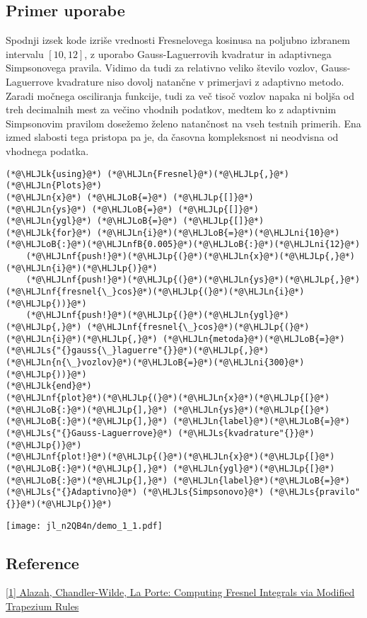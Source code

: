 \documentclass[12pt,a4paper]{article}
\newcommand{\HLJLk}[1]{\textcolor[RGB]{148,91,176}{\textbf{#1}}}
\newcommand{\HLJLn}[1]{#1}
\newcommand{\HLJLnf}[1]{\textcolor[RGB]{66,102,213}{#1}}
\newcommand{\HLJLs}[1]{\textcolor[RGB]{201,61,57}{#1}}
\newcommand{\HLJLnfB}[1]{\textcolor[RGB]{59,151,46}{#1}}
\newcommand{\HLJLni}[1]{\textcolor[RGB]{59,151,46}{#1}}
\newcommand{\HLJLoB}[1]{\textcolor[RGB]{102,102,102}{\textbf{#1}}}
\newcommand{\HLJLp}[1]{#1}
\begin{document}
\subsection{Primer uporabe}

Spodnji izsek kode izriše vrednosti Fresnelovega kosinusa na poljubno izbranem intervalu $[10,12]$, z uporabo Gauss-Laguerrovih kvadratur in adaptivnega Simpsonovega pravila. Vidimo da tudi za relativno veliko število vozlov, Gauss-Laguerrove kvadrature niso dovolj natančne v primerjavi z adaptivno metodo. Zaradi močnega osciliranja funkcije, tudi za več tisoč vozlov  napaka ni boljša od treh decimalnih mest za večino vhodnih podatkov, medtem ko z adaptivnim  Simpsonovim pravilom dosežemo želeno natančnost na vseh testnih primerih. Ena izmed slabosti tega pristopa pa je, da časovna kompleksnost ni neodvisna od vhodnega podatka. 


\begin{lstlisting}
(*@\HLJLk{using}@*) (*@\HLJLn{Fresnel}@*)(*@\HLJLp{,}@*) (*@\HLJLn{Plots}@*)
(*@\HLJLn{x}@*) (*@\HLJLoB{=}@*) (*@\HLJLp{[]}@*)
(*@\HLJLn{ys}@*) (*@\HLJLoB{=}@*) (*@\HLJLp{[]}@*)
(*@\HLJLn{ygl}@*) (*@\HLJLoB{=}@*) (*@\HLJLp{[]}@*)
(*@\HLJLk{for}@*) (*@\HLJLn{i}@*)(*@\HLJLoB{=}@*)(*@\HLJLni{10}@*)(*@\HLJLoB{:}@*)(*@\HLJLnfB{0.005}@*)(*@\HLJLoB{:}@*)(*@\HLJLni{12}@*)
    (*@\HLJLnf{push!}@*)(*@\HLJLp{(}@*)(*@\HLJLn{x}@*)(*@\HLJLp{,}@*) (*@\HLJLn{i}@*)(*@\HLJLp{)}@*)
    (*@\HLJLnf{push!}@*)(*@\HLJLp{(}@*)(*@\HLJLn{ys}@*)(*@\HLJLp{,}@*) (*@\HLJLnf{fresnel{\_}cos}@*)(*@\HLJLp{(}@*)(*@\HLJLn{i}@*)(*@\HLJLp{))}@*)
    (*@\HLJLnf{push!}@*)(*@\HLJLp{(}@*)(*@\HLJLn{ygl}@*)(*@\HLJLp{,}@*) (*@\HLJLnf{fresnel{\_}cos}@*)(*@\HLJLp{(}@*)(*@\HLJLn{i}@*)(*@\HLJLp{,}@*) (*@\HLJLn{metoda}@*)(*@\HLJLoB{=}@*)(*@\HLJLs{"{}gauss{\_}laguerre"{}}@*)(*@\HLJLp{,}@*) (*@\HLJLn{n{\_}vozlov}@*)(*@\HLJLoB{=}@*)(*@\HLJLni{300}@*)(*@\HLJLp{))}@*)
(*@\HLJLk{end}@*)
(*@\HLJLnf{plot}@*)(*@\HLJLp{(}@*)(*@\HLJLn{x}@*)(*@\HLJLp{[}@*)(*@\HLJLoB{:}@*)(*@\HLJLp{],}@*) (*@\HLJLn{ys}@*)(*@\HLJLp{[}@*)(*@\HLJLoB{:}@*)(*@\HLJLp{],}@*) (*@\HLJLn{label}@*)(*@\HLJLoB{=}@*)(*@\HLJLs{"{}Gauss-Laguerrove}@*) (*@\HLJLs{kvadrature"{}}@*)(*@\HLJLp{)}@*)
(*@\HLJLnf{plot!}@*)(*@\HLJLp{(}@*)(*@\HLJLn{x}@*)(*@\HLJLp{[}@*)(*@\HLJLoB{:}@*)(*@\HLJLp{],}@*) (*@\HLJLn{ygl}@*)(*@\HLJLp{[}@*)(*@\HLJLoB{:}@*)(*@\HLJLp{],}@*) (*@\HLJLn{label}@*)(*@\HLJLoB{=}@*)(*@\HLJLs{"{}Adaptivno}@*) (*@\HLJLs{Simpsonovo}@*) (*@\HLJLs{pravilo"{}}@*)(*@\HLJLp{)}@*)
\end{lstlisting}

\texttt{[image: jl\_n2QB4n/demo\_1\_1.pdf]}

\subsection{Reference}

\href{https://arxiv.org/pdf/1209.3451}{[1] Alazah, Chandler-Wilde, La Porte: Computing Fresnel Integrals via Modified Trapezium Rules}


\begin{lstlisting}

\end{lstlisting}
\end{document}
